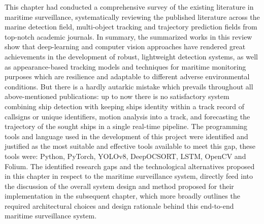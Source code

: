 This chapter had conducted a comprehensive survey of the existing literature in maritime surveillance, systematically reviewing the published literature across the marine detection field, multi-object tracking and trajectory prediction fields from top-notch academic journals. In summary, the summarized works in this review show that deep-learning and computer vision approaches have rendered great achievements in the development of robust, lightweight detection systems, as well as appearance-based tracking models and techniques for maritime monitoring purposes which are resilience and adaptable to different adverse environmental conditions. But there is a hardly autarkic mistake which prevails throughout all above-mentioned publications: up to now there is no satisfactory system combining ship detection with keeping ships identity within a track record of callsigns or unique identifiers, motion analysis into a track, and forecasting the trajectory of the sought ships in a single real-time pipeline. The programming tools and language used in the development of this project were identified and justified as the most suitable and effective tools available to meet this gap, these tools were: Python, PyTorch, YOLOv8, DeepOCSORT, LSTM, OpenCV and Folium. The identified research gaps and the technological alternatives proposed in this chapter in respect to the maritime surveillance system, directly feed into the discussion of the overall system design and method proposed for their implementation in the subsequent chapter, which more broadly outlines the required architectural choices and design rationale behind this end-to-end maritime surveillance system.
